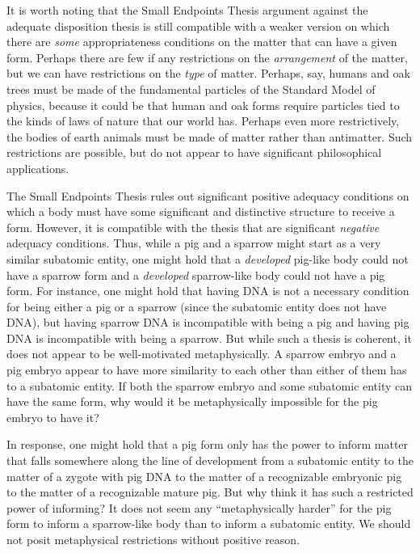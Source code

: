 It is worth noting that the Small Endpoints Thesis argument against the adequate disposition thesis is still compatible with 
a weaker version on which there are \textit{some} appropriateness conditions on the matter that can have a given form. Perhaps there 
are few if any restrictions on the \textit{arrangement} of the matter, but we can have restrictions on the \textit{type} of 
matter. Perhaps, say, humans and oak trees must be made of the fundamental particles of the Standard Model of physics,
because it could be that human and oak forms require particles tied to the kinds of laws of nature that our world has.
Perhaps even more restrictively, the bodies of earth animals must be made of matter rather than antimatter. Such restrictions
are possible, but do not appear to have significant philosophical applications.

The Small Endpoints Thesis rules out significant positive adequacy conditions on which a body must have some significant and 
distinctive structure to receive a form. However, it is compatible with the thesis that are significant \textit{negative} adequacy 
conditions. Thus, while a pig and a sparrow might start as a very similar subatomic entity, one might hold that a \textit{developed}
pig-like body could not have a sparrow form and a \textit{developed} sparrow-like body could not have a pig form. For instance, 
one might hold that having DNA is not a necessary condition for being either a pig or a sparrow (since the subatomic entity 
does not have DNA), but having sparrow DNA is incompatible with being a pig and having pig DNA is incompatible with being 
a sparrow. But while such a thesis is coherent, it does not appear to be well-motivated metaphysically. A sparrow embryo and 
a pig embryo appear to have more similarity to each other than either of them has to a subatomic entity. If both the sparrow 
embryo and some subatomic entity can have the same form, why would it be metaphysically impossible for the pig embryo to have 
it? 

In response, one might hold that a pig form only has the power to inform matter that falls somewhere along the line of 
development from a subatomic entity to the matter of a zygote with pig DNA to the matter of a recognizable embryonic pig to 
the matter of a recognizable mature pig. But why think it has such a restricted power of informing? It does not seem any 
``metaphysically harder'' for the pig form to inform a sparrow-like body than to inform a subatomic entity. We should not 
posit metaphysical restrictions without positive reason.

